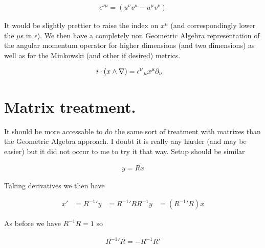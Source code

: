 \begin{align}\label{eqn:rotationGen:foo43}
\epsilon^{\nu\mu} = (u^\nu v^\mu - u^\mu v^\nu) 
\end{align}

It would be slightly prettier to raise the index on $x^\mu$ (and correspondingly lower the $\mu$s in $\epsilon$).  We then have a completely non Geometric Algebra representation of the angular momentum operator for higher dimensions (and two dimensions) as well as for the Minkowski (and other if desired) metrics.

\begin{align}\label{eqn:rotationGen:foo44}
i \cdot (x \wedge \nabla) 
&=
{\epsilon^{\nu}}_\mu x^\mu \partial_\nu 
\end{align}

\section{Matrix treatment.}

It should be more accessable to do the same sort of treatment with matrixes than the Geometric Algebra approach.  I doubt it is really any harder (and may be easier) but it did not occur to me to try it that way.  Setup should be similar

\begin{align}\label{eqn:rotationGen:boo1}
y = R x
\end{align}

Taking derivatives we then have

\begin{align*}
x' 
&= {R^{-1}}' y
&= {R^{-1}}' R R^{-1} y
&= ({R^{-1}}' R) x
\end{align*}

As before we have $R^{-1} R = 1$ so 

\begin{align}\label{eqn:rotationGen:boo2}
{R^{-1}}' R = -R^{-1} R'
\end{align}

\EndArticle
